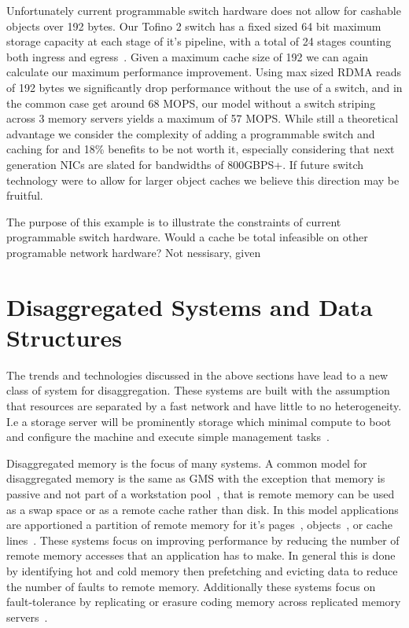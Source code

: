 \documentclass[12pt]{ucsddissertation}
\begin{document}
Unfortunately current programmable switch hardware does not allow for cashable objects over 192
bytes. Our Tofino 2 switch has a fixed sized 64 bit maximum storage capacity at each stage of it's
pipeline, with a total of 24 stages counting both ingress and egress~\cite{tofino2}. Given a maximum
cache size of 192 we can again calculate our maximum performance improvement. Using max sized RDMA
reads of 192 bytes we significantly drop performance without the use of a switch, and in the common
case get around 68 MOPS, our model without a switch striping across 3 memory servers yields a
maximum of 57 MOPS. While still a theoretical advantage we consider the complexity of adding a
programmable switch and caching for and 18\% benefits to be not worth it, especially considering
that next generation NICs are slated for bandwidths of 800GBPS+. If future switch technology were to
allow for larger object caches we believe this direction may be fruitful.

The purpose of this example is to illustrate the constraints of current programmable switch
hardware. Would a cache be total infeasible on other programable network hardware? Not nessisary,
given 



\section{Disaggregated Systems and Data Structures}

The trends and technologies discussed in the above sections have lead to a new class of system for
disaggregation. These systems are built with the assumption that resources are separated by a fast
network and have little to no heterogeneity. I.e a storage server will be prominently storage which
minimal compute to boot and configure the machine and execute simple management
tasks~\cite{aguilera2019designing,fast-networks,dis-and-app,legoos}.

Disaggregated memory is the focus of many systems. A common model for disaggregated memory is the
same as GMS with the exception that memory is passive and not part of a workstation pool~\cite{gms},
that is remote memory can be used as a swap space or as a remote cache rather than disk. In this
model applications are apportioned a partition of remote memory for it's
pages~\cite{infiniswap,fastswap,leap,blade-server,legoos,hydra}, objects~\cite{aifm,carbink}, or
cache lines~\cite{kona}. These systems focus on improving performance by reducing the number of
remote memory accesses that an application has to make. In general this is done by identifying hot
and cold memory then prefetching and evicting data to reduce the number of faults to remote memory.
Additionally these systems focus on fault-tolerance by replicating or erasure coding memory across
replicated memory servers~\cite{hydra}.
\end{document}
